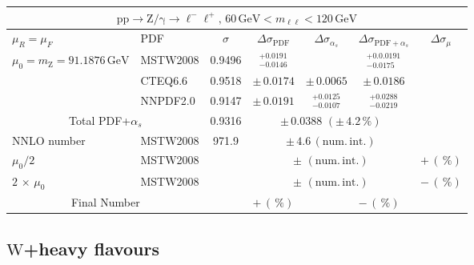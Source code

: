\begin{table}[htb]
  \begin{center}
    \begin{tabular}{|l|l|c|c|c|c|c|}
      \hline
      
      \multicolumn{7}{|c|}{$\mathrm{pp}\to\mathrm{Z/\gamma}\to{\ell^-\ell^+},\,60\,\mathrm{GeV}<m_{\ell\ell}<120\,\mathrm{GeV}$}\\ \hline
      $\mu_R=\mu_F$ & PDF & $\sigma$ & $\Delta\sigma_{\mathrm{PDF}}$ & $\Delta\sigma_{\alpha_s}$ & $\Delta\sigma_{\mathrm{PDF}+\alpha_s}$ & $\Delta\sigma_{\mu}$ \\ \hline\hline

      $\mu_0=m_\mathrm{Z}=91.1876\,\mathrm{GeV}$ & MSTW2008 & 0.9496  & $^{+0.0191}_{-0.0146}$ &     &  $^{+0.0.0191}_{-0.0175}$    &     \\
                                                 & CTEQ6.6  & 0.9518 & $\pm\,0.0174$ &  $\pm\,0.0065$  &  $\pm\,0.0186$       &     \\
                                                 & NNPDF2.0 & 0.9147 & $\pm\,0.0191$ &  $^{+0.0125}_{-0.0107}$  & $^{+0.0288}_{-0.0219}$     &     \\ \hline\hline
      \multicolumn{2}{|c|}{Total PDF+$\alpha_s$}      &  0.9316    & \multicolumn{3}{c|}{$\pm\,0.0388\,\,(\pm\,4.2\,\%)$} & \\ \hline\hline
      NNLO number                               & MSTW2008 & 971.9 & \multicolumn{3}{c|}{$\pm\,4.6\,(\mathrm{num.\,int.})$} & \\
      $\mu_0/2$                                 & MSTW2008 &  & \multicolumn{3}{c|}{$\pm\,\,(\mathrm{num.\,int.})$} & $+\,(\,\%)$\\
      $2\,\times\,\mu_0$                        & MSTW2008 &  & \multicolumn{3}{c|}{$\pm\,\,(\mathrm{num.\,int.})$} & $-\,(\,\%)$\\ \hline\hline
      \multicolumn{2}{|c|}{Final Number} &  & \multicolumn{2}{l}{$+\,(\,\%)$} & \multicolumn{2}{l|}{$-\,(\,\%)$} \\




\hline 
\end{tabular}
\end{center}
\end{table} 


\subsection*{\boldmath $\mathrm{W}$+heavy flavours}

